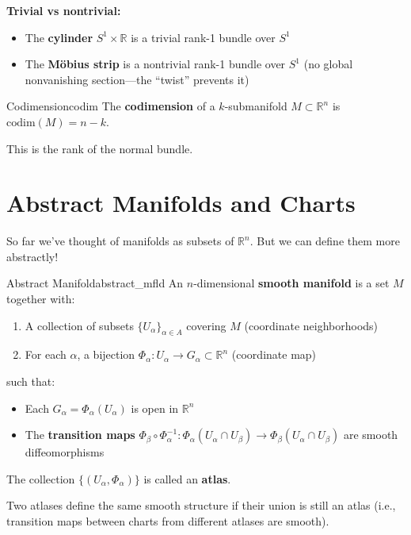 \documentclass[11pt, letterpaper, openany]{book}
\begin{document}
\begin{example}
\textbf{Trivial vs nontrivial:}
\begin{itemize}
    \item The \textbf{cylinder} $S^1 \times \mathbb{R}$ is a trivial rank-1 bundle over $S^1$
    \item The \textbf{Möbius strip} is a nontrivial rank-1 bundle over $S^1$ (no global nonvanishing section---the ``twist'' prevents it)
\end{itemize}
\end{example}

\begin{defn}{Codimension}{codim}
The \textbf{codimension} of a $k$-submanifold $M \subset \mathbb{R}^n$ is $\text{codim}(M) = n - k$.

This is the rank of the normal bundle.
\end{defn}

\section{Abstract Manifolds and Charts}

So far we've thought of manifolds as subsets of $\mathbb{R}^n$. But we can define them more abstractly!

\begin{defn}{Abstract Manifold}{abstract_mfld}
An $n$-dimensional \textbf{smooth manifold} is a set $M$ together with:
\begin{enumerate}
    \item A collection of subsets $\{U_\alpha\}_{\alpha \in A}$ covering $M$ (coordinate neighborhoods)
    \item For each $\alpha$, a bijection $\Phi_\alpha: U_\alpha \to G_\alpha \subset \mathbb{R}^n$ (coordinate map)
\end{enumerate}
such that:
\begin{itemize}
    \item Each $G_\alpha = \Phi_\alpha(U_\alpha)$ is open in $\mathbb{R}^n$
    \item The \textbf{transition maps} $\Phi_\beta \circ \Phi_\alpha^{-1}: \Phi_\alpha(U_\alpha \cap U_\beta) \to \Phi_\beta(U_\alpha \cap U_\beta)$ are smooth diffeomorphisms
\end{itemize}
The collection $\{(U_\alpha, \Phi_\alpha)\}$ is called an \textbf{atlas}.
\end{defn}

\begin{remark}
Two atlases define the same smooth structure if their union is still an atlas (i.e., transition maps between charts from different atlases are smooth).
\end{remark}
\end{document}
